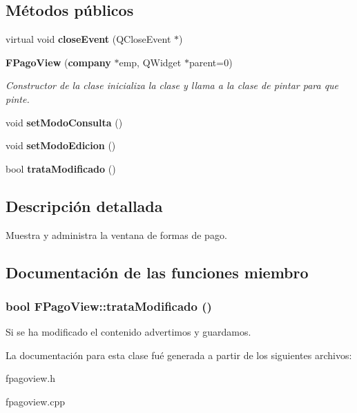 \subsection*{M\'{e}todos p\'{u}blicos}
\begin{CompactItemize}
\item 
virtual void {\bf close\-Event} (QClose\-Event $\ast$)\label{classFPagoView_a0}

\item 
{\bf FPago\-View} ({\bf company} $\ast$emp, QWidget $\ast$parent=0)\label{classFPagoView_a1}

\begin{CompactList}\small\item\em Constructor de la clase inicializa la clase y llama a la clase de pintar para que pinte. \item\end{CompactList}\item 
void {\bf set\-Modo\-Consulta} ()\label{classFPagoView_a2}

\item 
void {\bf set\-Modo\-Edicion} ()\label{classFPagoView_a3}

\item 
bool {\bf trata\-Modificado} ()
\end{CompactItemize}


\subsection{Descripci\'{o}n detallada}
Muestra y administra la ventana de formas de pago. 



\subsection{Documentaci\'{o}n de las funciones miembro}
\subsubsection{\setlength{\rightskip}{0pt plus 5cm}bool FPago\-View::trata\-Modificado ()}\label{classFPagoView_a4}


Si se ha modificado el contenido advertimos y guardamos. 

La documentaci\'{o}n para esta clase fu\'{e} generada a partir de los siguientes archivos:\begin{CompactItemize}
\item 
fpagoview.h\item 
fpagoview.cpp\end{CompactItemize}
